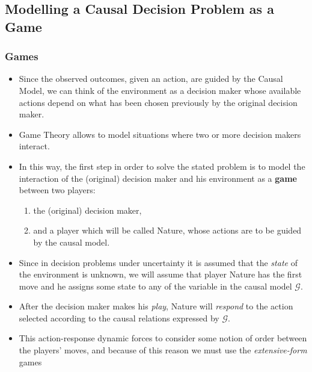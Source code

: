 \documentclass{beamer}
\theoremstyle{plain}
\begin{document}
\subsection{Modelling a Causal Decision Problem as a Game}
\begin{frame}
\frametitle{Games}
\begin{itemize}
\item Since the observed outcomes, given an action, are guided by the Causal Model, we can think of the environment as a decision maker whose available actions depend on what has been chosen previously by the original decision maker.
\item Game Theory allows to model situations where two or more decision makers interact.
\item In this way, the first step in order to solve the stated problem is to model the interaction of the (original) decision maker and his environment as a \textbf{game} between two players: 
\begin{enumerate}
\item the (original) decision maker, 
\item and a player which will be called Nature, whose actions are to be guided by the causal model.
\end{enumerate}
\end{itemize}
\end{frame}
\begin{frame}
\begin{itemize}
\item  Since in decision problems under uncertainty it is assumed that the \textit{state} of the environment is unknown, we will assume that player Nature has the first move and he assigns some state to any of the variable in the causal model $\mathcal{G}$.
\item After the decision maker makes his \textit{play}, Nature will \textit{respond} to the action selected according to the causal relations expressed by $\mathcal{G}$.
\item This action-response dynamic forces to consider some notion of order between the players' moves, and because of this reason we must use the \textit{extensive-form} games
\end{itemize}
\end{frame}
\end{document}
